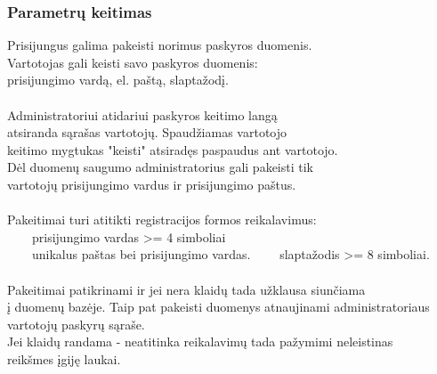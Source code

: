 \documentclass[a4paper,12pt]{article}
\newcommand{\tabitem}{~~\llap{\textbullet}~~}
\begin{document}
\subsubsection{Parametrų keitimas}
Prisijungus galima pakeisti norimus paskyros duomenis.\\
Vartotojas gali keisti savo paskyros duomenis: \\
	prisijungimo vardą, el. paštą, slaptažodį. \\\\
	
Administratoriui atidariui paskyros keitimo langą\\
atsiranda sąrašas vartotojų. Spaudžiamas vartotojo \\
keitimo mygtukas "keisti" atsiradęs paspaudus ant vartotojo.\\
Dėl duomenų saugumo administratorius gali pakeisti tik\\
vartotojų prisijungimo vardus ir prisijungimo paštus. \\\\

Pakeitimai turi atitikti registracijos formos reikalavimus: \\
	\tabitem prisijungimo vardas >= 4 simboliai\\
	\tabitem unikalus paštas bei prisijungimo vardas.
    \tabitem slaptažodis >= 8 simboliai. \\\\
    
Pakeitimai patikrinami ir jei nera klaidų tada užklausa siunčiama \\
į duomenų bazėje. Taip pat pakeisti duomenys atnaujinami administratoriaus \\
vartotojų paskyrų sąraše. \\
Jei klaidų randama - neatitinka reikalavimų tada pažymimi neleistinas \\
reikšmes įgiję laukai.\\
\end{document}
